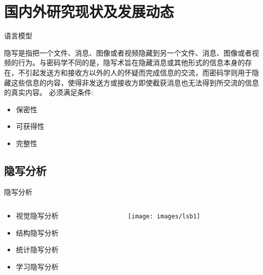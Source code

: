 \documentclass[14pt]{Bredelebeamer}
\begin{document}
\section{国内外研究现状及发展动态}
\begin{frame}{语言模型}

{\large
隐写是指把一个文件、消息、图像或者视频隐藏到另一个文件、消息、图像或者视频的行为。与密码学不同的是，隐写术旨在隐藏消息或其他形式的信息本身的\alert{存在}，不引起发送方和接收方以外的人的怀疑而完成信息的交流，而密码学则用于隐藏这些信息的\alert{内容}，使得非发送方或接收方即使截获消息也无法得到所交流的信息的真实内容。
必须满足条件:
\pause
\begin{itemize}
  \item	保密性
  \item 可获得性
  \item 完整性
\end{itemize}
}
\end{frame}


\subsection{隐写分析}

\begin{frame}{隐写分析}
  \begin{columns}
    \begin{column}{.25\textwidth}
      \begin{block}{}
        \begin{itemize}
          \item \alert<2>{视觉隐写分析}
          \item 结构隐写分析
          \item 统计隐写分析
          \item 学习隐写分析
        \end{itemize}
      \end{block}
    \end{column}
    \begin{column}{.7\textwidth}
      \pause
      \begin{figure}
        \centering
        \texttt{[image: images/lsb1]}
      \end{figure}
    \end{column}
  \end{columns}
\end{frame}
\end{document}
